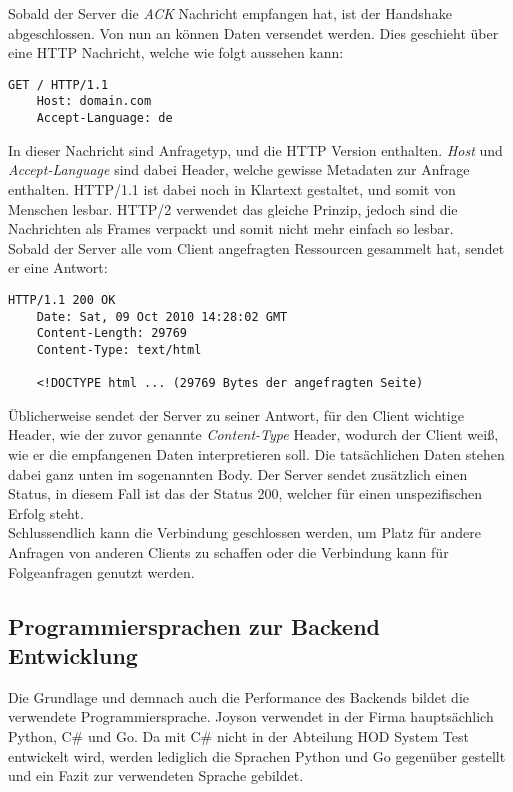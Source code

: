Sobald der Server die \textit{ACK} Nachricht empfangen hat, ist der Handshake
abgeschlossen. Von nun an können Daten versendet werden. Dies geschieht über
eine HTTP Nachricht, welche wie folgt aussehen kann:

\begin{lstlisting}[caption=Beispielhafte HTTP Anfrage]
    GET / HTTP/1.1
    Host: domain.com
    Accept-Language: de
\end{lstlisting}

In dieser Nachricht sind Anfragetyp, und die HTTP Version enthalten. \textit{Host}
und \textit{Accept-Language} sind dabei Header, welche gewisse Metadaten zur 
Anfrage enthalten. HTTP/1.1 ist dabei noch in Klartext gestaltet, und somit 
von Menschen lesbar. HTTP/2 verwendet das gleiche Prinzip, jedoch sind die 
Nachrichten als Frames verpackt und somit nicht mehr einfach so lesbar. \\

Sobald der Server alle vom Client angefragten Ressourcen gesammelt hat, 
sendet er eine Antwort:

\begin{lstlisting}[caption=Beispielhafte HTTP Antwort]
    HTTP/1.1 200 OK
    Date: Sat, 09 Oct 2010 14:28:02 GMT
    Content-Length: 29769
    Content-Type: text/html
    
    <!DOCTYPE html ... (29769 Bytes der angefragten Seite)
\end{lstlisting}

Üblicherweise sendet der Server zu seiner Antwort, für den Client wichtige Header,
wie der zuvor genannte \textit{Content-Type} Header, wodurch der Client weiß,
wie er die empfangenen Daten interpretieren soll. Die tatsächlichen Daten stehen
dabei ganz unten im sogenannten Body. Der Server sendet zusätzlich einen Status,
in diesem Fall ist das der Status 200, welcher für einen unspezifischen Erfolg
steht. \\

Schlussendlich kann die Verbindung geschlossen werden, um Platz für andere Anfragen
von anderen Clients zu schaffen oder die Verbindung kann für Folgeanfragen genutzt
werden.


\subsection{Programmiersprachen zur Backend Entwicklung}
Die Grundlage und demnach auch die Performance des Backends bildet die 
verwendete Programmiersprache. Joyson verwendet in der Firma hauptsächlich 
Python, C\# und Go. Da mit C\# nicht in der Abteilung 
\gls{HOD} System Test entwickelt wird, werden lediglich die 
Sprachen Python und Go gegenüber gestellt und ein Fazit zur verwendeten Sprache 
gebildet. \\

